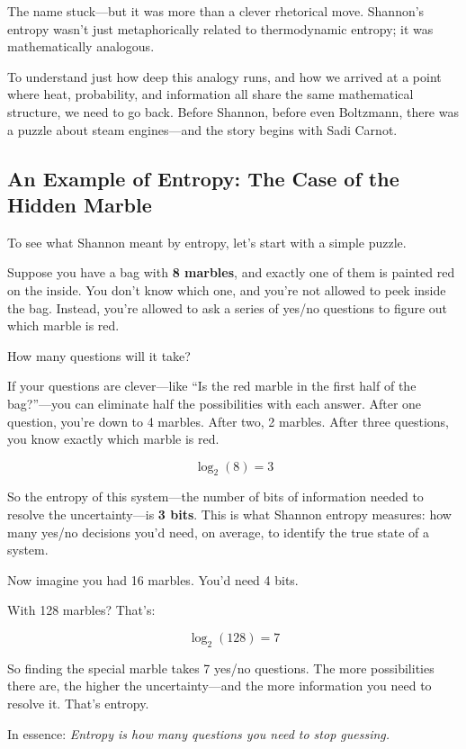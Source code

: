 The name stuck—but it was more than a clever rhetorical move. Shannon’s entropy wasn’t just metaphorically related to thermodynamic entropy; it was mathematically analogous. 

To understand just how deep this analogy runs, and how we arrived at a point where heat, probability, and information all share the same mathematical structure, we need to go back. Before Shannon, before even Boltzmann, there was a puzzle about steam engines—and the story begins with Sadi Carnot.


\subsection{An Example of Entropy: The Case of the Hidden Marble}

To see what Shannon meant by entropy, let’s start with a simple puzzle.

Suppose you have a bag with \textbf{8 marbles}, and exactly one of them is painted red on the inside. You don’t know which one, and you’re not allowed to peek inside the bag. Instead, you’re allowed to ask a series of yes/no questions to figure out which marble is red.

How many questions will it take?

If your questions are clever—like “Is the red marble in the first half of the bag?”—you can eliminate half the possibilities with each answer. After one question, you’re down to 4 marbles. After two, 2 marbles. After three questions, you know exactly which marble is red.

\[
\log_2(8) = 3
\]

So the entropy of this system—the number of bits of information needed to resolve the uncertainty—is \textbf{3 bits}. This is what Shannon entropy measures: how many yes/no decisions you’d need, on average, to identify the true state of a system.

\medskip

Now imagine you had 16 marbles. You’d need 4 bits.

With 128 marbles? That’s:

\[
\log_2(128) = 7
\]

So finding the special marble takes 7 yes/no questions. The more possibilities there are, the higher the uncertainty—and the more information you need to resolve it. That’s entropy.

\medskip

In essence: \textit{Entropy is how many questions you need to stop guessing.}


